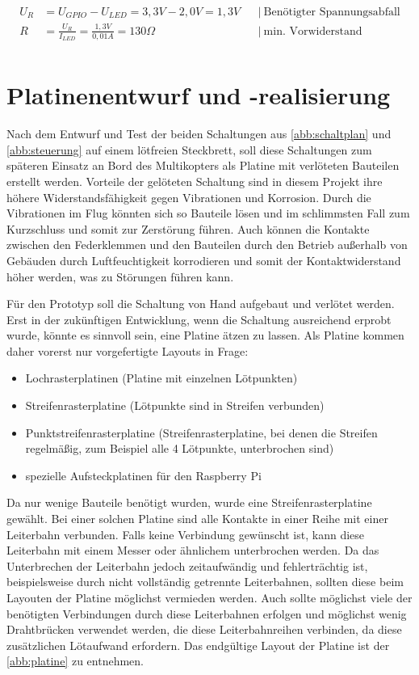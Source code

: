 \documentclass[a4paper,12pt,bibliography=totoc, listof=totoc,titlepage,pointlessnumbers]{scrreprt}
\begin{document}
\begin{equation}
\begin{aligned}
U_R &= U_{GPIO} - U_{LED} = 3,3V - 2,0V = 1,3V    && \left|\  \text{Benötigter Spannungsabfall} \right. \\
R &= \frac{U_R}{I_{LED}} = \frac{1,3V}{0,01A} = 130\Omega   && \left|\  \text{min. Vorwiderstand} \right. \\
\end{aligned}
\label{eq:vorwiderstand}
\end{equation}

\section{Platinenentwurf und -realisierung}
Nach dem Entwurf und Test der beiden Schaltungen aus \autoref{abb:schaltplan} und \autoref{abb:steuerung} auf einem lötfreien Steckbrett, soll diese Schaltungen zum späteren Einsatz an Bord des Multikopters als Platine mit verlöteten Bauteilen erstellt werden. Vorteile der gelöteten Schaltung sind in diesem Projekt ihre höhere Widerstandsfähigkeit gegen Vibrationen und Korrosion. Durch die Vibrationen im Flug könnten sich so Bauteile lösen und im schlimmsten Fall zum Kurzschluss und somit zur Zerstörung führen. Auch können die Kontakte zwischen den Federklemmen und den Bauteilen durch den Betrieb außerhalb von Gebäuden durch Luftfeuchtigkeit korrodieren und somit der Kontaktwiderstand höher werden, was zu Störungen führen kann.

Für den Prototyp soll die Schaltung von Hand aufgebaut und verlötet werden. Erst in der zukünftigen Entwicklung, wenn die Schaltung ausreichend erprobt wurde, könnte es sinnvoll sein, eine Platine ätzen zu lassen. Als Platine kommen daher vorerst nur vorgefertigte Layouts in Frage:

\begin{itemize}
 \item Lochrasterplatinen (Platine mit einzelnen Lötpunkten)
 \item Streifenrasterplatine (Lötpunkte sind in Streifen verbunden)
 \item Punktstreifenrasterplatine (Streifenrasterplatine, bei denen die Streifen regelmäßig, zum Beispiel alle 4 Lötpunkte, unterbrochen sind)
 \item spezielle Aufsteckplatinen für den Raspberry Pi
\end{itemize}

Da nur wenige Bauteile benötigt wurden, wurde eine Streifenrasterplatine gewählt. Bei einer solchen Platine sind alle Kontakte in einer Reihe mit einer Leiterbahn verbunden. Falls keine Verbindung gewünscht ist, kann diese Leiterbahn mit einem Messer oder ähnlichem unterbrochen werden. Da das Unterbrechen der Leiterbahn jedoch zeitaufwändig und fehlerträchtig ist, beispielsweise durch nicht vollständig getrennte Leiterbahnen, sollten diese beim Layouten der Platine möglichst vermieden werden. Auch sollte möglichst viele der benötigten Verbindungen durch diese Leiterbahnen erfolgen und möglichst wenig Drahtbrücken verwendet werden, die diese Leiterbahnreihen verbinden, da diese zusätzlichen Lötaufwand erfordern. Das endgültige Layout der Platine ist der \autoref{abb:platine} zu entnehmen.
\end{document}
